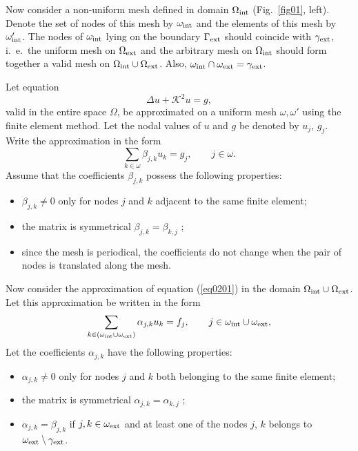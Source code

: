 \documentclass[12pt]{article}
\newcommand{\rin}{{\rm int}}
\newcommand{\rex}{{\rm ext}}
\newcommand{\K}{\mathcal{K}}
\newcommand{\fref}[1]{Fig.~\ref{#1}}
\begin{document}
Now consider a non-uniform mesh defined in domain $\Omega_\rin$ (\fref{fig01}, left).
Denote the set of nodes of this mesh by
$\omega_\rin$ and the elements of this mesh by $\omega'_\rin$.
The nodes of $\omega_\rin$ lying on the boundary $\Gamma_\rex$
should coincide with $\gamma_\rex$, i.\ e.\ the uniform mesh on $\Omega_\rex$ and the arbitrary mesh
on $\Omega_\rin$ should form together a valid mesh on $\Omega_\rin \cup \Omega_\rex$.
Also, $\omega_\rin \cap \omega_\rex = \gamma_\rex$.

Let equation
\begin{equation}
\Delta u + \K^2 u = g,
\label{eq0201a}
\end{equation}
valid in the entire space $\Omega$,
be approximated on a uniform mesh $\omega, \omega'$ using the finite element
method. Let the nodal values of $u$ and $g$ be denoted by $u_j$, $g_j$. Write the approximation
in the form
\begin{equation}
\sum_{k \in \omega} \beta_{j,k} u_k = g_j ,
\qquad
j \in \omega .
\label{eq0202}
\end{equation}
Assume that the coefficients $\beta_{j,k}$ possess the following properties:
\begin{itemize}
\item
$\beta_{j,k} \ne 0$ only for nodes $j$ and $k$ adjacent to the same finite element;
\item
the matrix is symmetrical $\beta_{j,k} = \beta_{k,j}$ ;
\item
since the mesh is periodical, the coefficients do not change when the pair of nodes is translated
along the mesh.
\end{itemize}

Now consider the approximation of equation (\ref{eq0201}) in the domain $\Omega_\rin \cup \Omega_\rex$. Let this
approximation be written in the form
\begin{equation}
\sum_{k \in (\omega_\rin \cup \omega_\rex) }\alpha_{j,k} u_k
= f_j, \qquad j \in \omega_\rin \cup  \omega_\rex ,
\label{eq0203}
\end{equation}
Let the coefficients $\alpha_{j,k}$ have the following properties:
\begin{itemize}
\item
$\alpha_{j,k} \ne 0$ only for nodes $j$ and $k$ both belonging to the same finite element;
\item
the matrix is symmetrical $\alpha_{j,k} = \alpha_{k,j}$ ;
\item
$\alpha_{j,k} = \beta_{j,k}$ if $j, k \in \omega_\rex$ and  at least one of the nodes $j$, $k$ belongs to
$\omega_\rex \setminus \gamma_\rex$.
\end{itemize}
\end{document}
